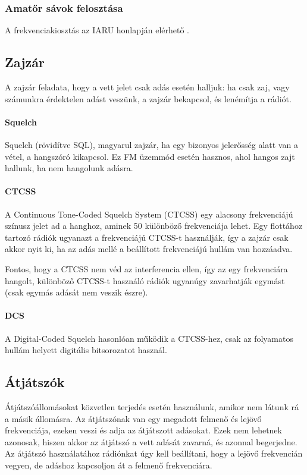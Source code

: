 \documentclass[12pt,a4paper]{article}
\begin{document}
\subsubsection{Amatőr sávok felosztása}

A frekvenciakiosztás az IARU honlapján elérhető \cite{iaru}.

\subsection{Zajzár}

A zajzár feladata, hogy a vett jelet csak adás esetén halljuk: ha csak zaj, vagy számunkra érdektelen adást veszünk, a zajzár bekapcsol, és lenémítja a rádiót.

\paragraph{Squelch}

Squelch (rövidítve SQL), magyarul zajzár, ha egy bizonyos jelerősség alatt van a vétel, a hangszóró kikapcsol. Ez FM üzemmód esetén hasznos, ahol hangos zajt hallunk, ha nem hangolunk adásra.
\paragraph{CTCSS}

A Continuous Tone-Coded Squelch System (CTCSS) egy alacsony frekvenciájú színusz jelet ad a hanghoz, aminek 50 különböző frekvenciája lehet. Egy flottához tartozó rádiók ugyanazt a frekvenciájú CTCSS-t használják, így a zajzár csak akkor nyit ki, ha az adás mellé a beállított frekvenciájú hullám van hozzáadva.

Fontos, hogy a CTCSS nem véd az interferencia ellen, így az egy frekvenciára hangolt, különböző CTCSS-t használó rádiók ugyanúgy zavarhatják egymást (csak egymás adását nem veszik észre).
\paragraph{DCS}
A Digital-Coded Squelch hasonlóan működik a CTCSS-hez, csak az folyamatos hullám helyett digitális bitsorozatot használ.
\subsection{Átjátszók}
Átjátszóállomásokat közvetlen terjedés esetén használunk, amikor nem látunk rá a másik állomásra. Az átjátszónak van egy megadott felmenő és lejövő frekvenciája, ezeken veszi és adja az átjátszott adásokat. Ezek nem lehetnek azonosak, hiszen akkor az átjátszó a vett adását zavarná, és azonnal begerjedne. Az átjátszó használatához rádiónkat úgy kell beállítani, hogy a lejövő frekvencián vegyen, de adáshoz kapcsoljon át a felmenő frekvenciára. 
\end{document}
